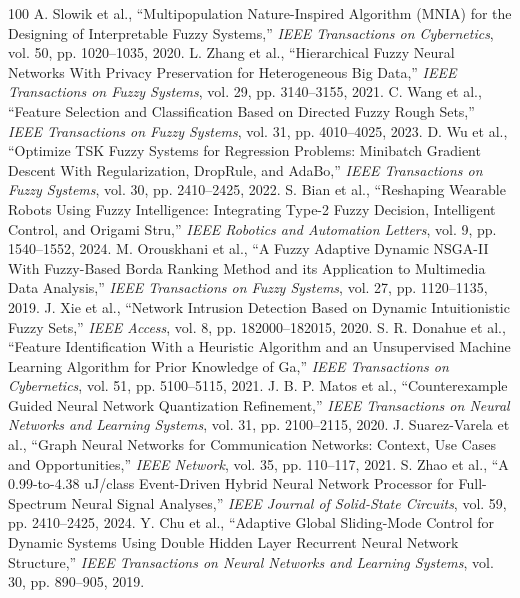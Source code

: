 \documentclass[journal]{IEEEtran}
\begin{document}
\begin{thebibliography}{100}
 A. Slowik et al., ``Multipopulation Nature-Inspired Algorithm (MNIA) for the Designing of Interpretable Fuzzy Systems,'' \emph{IEEE Transactions on Cybernetics}, vol. 50, pp. 1020--1035, 2020.
 L. Zhang et al., ``Hierarchical Fuzzy Neural Networks With Privacy Preservation for Heterogeneous Big Data,'' \emph{IEEE Transactions on Fuzzy Systems}, vol. 29, pp. 3140--3155, 2021.
 C. Wang et al., ``Feature Selection and Classification Based on Directed Fuzzy Rough Sets,'' \emph{IEEE Transactions on Fuzzy Systems}, vol. 31, pp. 4010--4025, 2023.
 D. Wu et al., ``Optimize TSK Fuzzy Systems for Regression Problems: Minibatch Gradient Descent With Regularization, DropRule, and AdaBo,'' \emph{IEEE Transactions on Fuzzy Systems}, vol. 30, pp. 2410--2425, 2022.
 S. Bian et al., ``Reshaping Wearable Robots Using Fuzzy Intelligence: Integrating Type-2 Fuzzy Decision, Intelligent Control, and Origami Stru,'' \emph{IEEE Robotics and Automation Letters}, vol. 9, pp. 1540--1552, 2024.
 M. Orouskhani et al., ``A Fuzzy Adaptive Dynamic NSGA-II With Fuzzy-Based Borda Ranking Method and its Application to Multimedia Data Analysis,'' \emph{IEEE Transactions on Fuzzy Systems}, vol. 27, pp. 1120--1135, 2019.
 J. Xie et al., ``Network Intrusion Detection Based on Dynamic Intuitionistic Fuzzy Sets,'' \emph{IEEE Access}, vol. 8, pp. 182000--182015, 2020.
 S. R. Donahue et al., ``Feature Identification With a Heuristic Algorithm and an Unsupervised Machine Learning Algorithm for Prior Knowledge of Ga,'' \emph{IEEE Transactions on Cybernetics}, vol. 51, pp. 5100--5115, 2021.
 J. B. P. Matos et al., ``Counterexample Guided Neural Network Quantization Refinement,'' \emph{IEEE Transactions on Neural Networks and Learning Systems}, vol. 31, pp. 2100--2115, 2020.
 J. Suarez-Varela et al., ``Graph Neural Networks for Communication Networks: Context, Use Cases and Opportunities,'' \emph{IEEE Network}, vol. 35, pp. 110--117, 2021.
 S. Zhao et al., ``A 0.99-to-4.38 uJ/class Event-Driven Hybrid Neural Network Processor for Full-Spectrum Neural Signal Analyses,'' \emph{IEEE Journal of Solid-State Circuits}, vol. 59, pp. 2410--2425, 2024.
 Y. Chu et al., ``Adaptive Global Sliding-Mode Control for Dynamic Systems Using Double Hidden Layer Recurrent Neural Network Structure,'' \emph{IEEE Transactions on Neural Networks and Learning Systems}, vol. 30, pp. 890--905, 2019.

\end{thebibliography}
\end{document}
